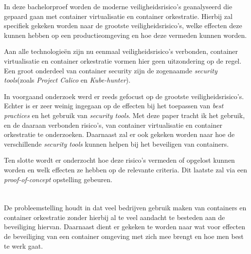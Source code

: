 In deze bachelorproef worden de moderne veiligheidsrisico’s geanalyseerd die gepaard gaan met container virtualisatie en container orkestratie. Hierbij zal specifiek gekeken worden naar de grootste veiligheidsrisico’s, welke effecten deze kunnen hebben op een productieomgeving en hoe deze vermeden kunnen worden.

Aan alle technologieën zijn nu eenmaal veiligheidsrisico’s verbonden, container virtualisatie en container orkestratie vormen hier geen uitzondering op de regel. Een groot onderdeel van container security zijn de zogenaamde \textit{security tools}(zoals \textit{Project Calico} en \textit{Kube-hunter}).

In voorgaand onderzoek werd er reeds gefocust op de grootste veiligheidsrisico's. Echter is er zeer weinig ingegaan op de effecten bij het toepassen van \textit{best practices} en het gebruik van  \textit{security tools}. Met deze paper tracht ik het gebruik, en de daaraan verbonden risico’s, van container virtualisatie en container orkestratie te onderzoeken. Daarnaast zal er ook gekeken worden naar hoe de verschillende \textit{security tools} kunnen helpen bij het beveiligen van containers.

Ten slotte wordt er onderzocht hoe deze risico’s vermeden of opgelost kunnen worden en welk effecten ze hebben op de relevante criteria. Dit laatste zal via een \textit{proof-of-concept} opstelling gebeuren.

\section{}
\label{sec:probleemstelling}

De probleemstelling houdt in dat veel bedrijven gebruik maken van containers en container orkestratie zonder hierbij al te veel aandacht te besteden aan de beveiliging hiervan. Daarnaast dient er gekeken te worden naar wat voor effecten de beveiliging van een container omgeving met zich mee brengt en hoe men best te werk gaat.

